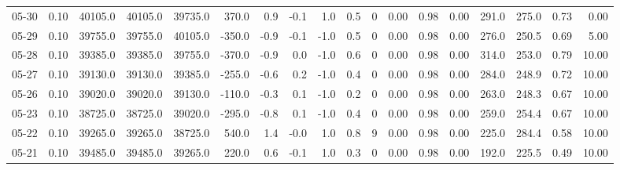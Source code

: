\begin{threeparttable}
{\begin{tabular}{lrrrrrrrrrrrrrrrrr}
  05-30 &     0.10 & 40105.0 & 40105.0 & 39735.0 &      370.0 &            0.9 &                      -0.1 &                      1.0 &                 0.5 &              0 &       0.00 &      0.98 &           0.00 &            291.0 &               275.0 &            0.73 &                   0.00 \\
  05-29 &     0.10 & 39755.0 & 39755.0 & 40105.0 &     -350.0 &           -0.9 &                      -0.1 &                     -1.0 &                 0.5 &              0 &       0.00 &      0.98 &           0.00 &            276.0 &               250.5 &            0.69 &                   5.00 \\
  05-28 &     0.10 & 39385.0 & 39385.0 & 39755.0 &     -370.0 &           -0.9 &                       0.0 &                     -1.0 &                 0.6 &              0 &       0.00 &      0.98 &           0.00 &            314.0 &               253.0 &            0.79 &                  10.00 \\
  05-27 &     0.10 & 39130.0 & 39130.0 & 39385.0 &     -255.0 &           -0.6 &                       0.2 &                     -1.0 &                 0.4 &              0 &       0.00 &      0.98 &           0.00 &            284.0 &               248.9 &            0.72 &                  10.00 \\
  05-26 &     0.10 & 39020.0 & 39020.0 & 39130.0 &     -110.0 &           -0.3 &                       0.1 &                     -1.0 &                 0.2 &              0 &       0.00 &      0.98 &           0.00 &            263.0 &               248.3 &            0.67 &                  10.00 \\
  05-23 &     0.10 & 38725.0 & 38725.0 & 39020.0 &     -295.0 &           -0.8 &                       0.1 &                     -1.0 &                 0.4 &              0 &       0.00 &      0.98 &           0.00 &            259.0 &               254.4 &            0.67 &                  10.00 \\
  05-22 &     0.10 & 39265.0 & 39265.0 & 38725.0 &      540.0 &            1.4 &                      -0.0 &                      1.0 &                 0.8 &              9 &       0.00 &      0.98 &           0.00 &            225.0 &               284.4 &            0.58 &                  10.00 \\
  05-21 &     0.10 & 39485.0 & 39485.0 & 39265.0 &      220.0 &            0.6 &                      -0.1 &                      1.0 &                 0.3 &              0 &       0.00 &      0.98 &           0.00 &            192.0 &               225.5 &            0.49 &                  10.00 \\

\end{tabular}}
\end{threeparttable}
